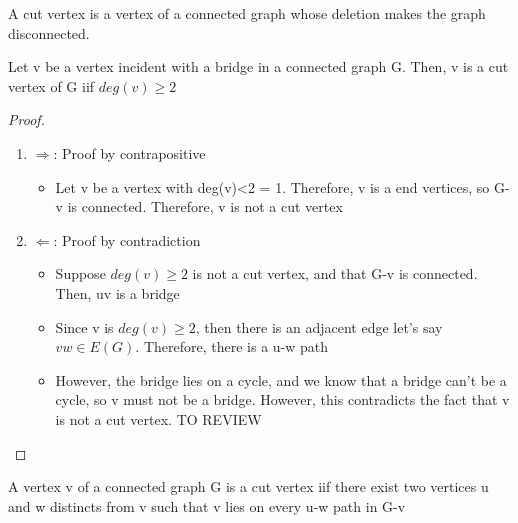 \documentclass{article}
\begin{document}
\begin{definition}
    A cut vertex is a vertex of a connected graph whose deletion makes the
    graph disconnected.
\end{definition}

\begin{theorem}
    Let v be a vertex incident with a bridge in a connected graph G. Then, v
    is a cut vertex of G iif $deg(v) \geq 2$
\end{theorem}

\begin{proof}
    \begin{enumerate}
        \item $\Longrightarrow$: Proof by contrapositive
	    \begin{itemize}
		\item Let v be a vertex with deg(v)<2 = 1. Therefore, v
		    is a end vertices, so G-v is connected. Therefore, v is
		    not a cut vertex
	    \end{itemize}
        \item $\Longleftarrow$: Proof by contradiction
	    \begin{itemize}
		\item Suppose $deg(v) \geq 2$ is not a cut vertex, and that
		    G-v is connected. Then, uv is a bridge
		\item Since v is $deg(v) \geq 2$, then there is an adjacent edge
		    let's say $vw \in E(G)$. Therefore, there is a u-w path
		\item However, the bridge lies on a cycle, and we know that a
		    bridge can't be a cycle, so v must not be a bridge. However,
		    this contradicts the fact that v is not a cut vertex.
		    TO REVIEW
	    \end{itemize}
    \end{enumerate}
\end{proof}


\begin{theorem}
    A vertex v of a connected graph G is a cut vertex iif there exist two
    vertices u and w distincts from v such that v lies on every u-w path in
    G-v
\end{theorem}
\end{document}
